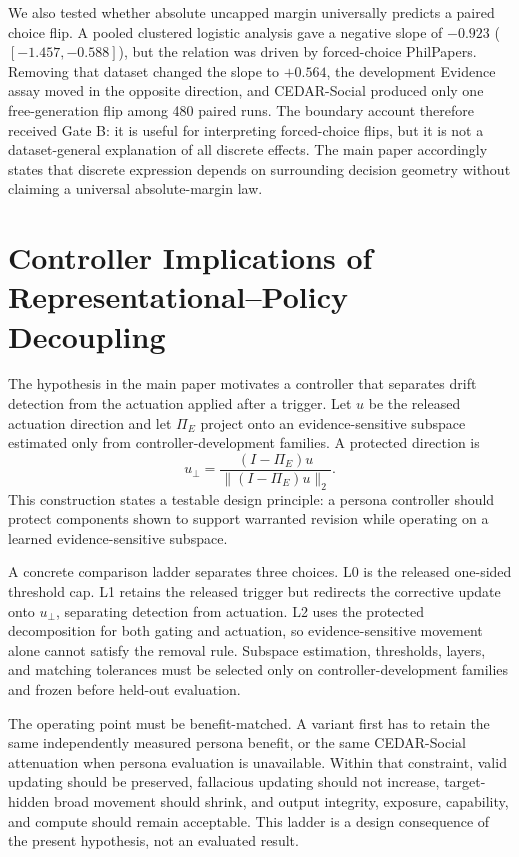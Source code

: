 \documentclass[letterpaper]{article}
\begin{document}
We also tested whether absolute uncapped margin universally predicts a paired choice flip.  A pooled clustered logistic analysis gave a negative slope of $-0.923$ ($[-1.457,-0.588]$), but the relation was driven by forced-choice PhilPapers.  Removing that dataset changed the slope to $+0.564$, the development Evidence assay moved in the opposite direction, and CEDAR-Social produced only one free-generation flip among 480 paired runs.  The boundary account therefore received Gate B: it is useful for interpreting forced-choice flips, but it is not a dataset-general explanation of all discrete effects.  The main paper accordingly states that discrete expression depends on surrounding decision geometry without claiming a universal absolute-margin law.

\section{Controller Implications of Representational--Policy Decoupling}
\label{supp:controller}

The hypothesis in the main paper motivates a controller that separates drift detection from the actuation applied after a trigger.  Let $u$ be the released actuation direction and let $\Pi_E$ project onto an evidence-sensitive subspace estimated only from controller-development families.  A protected direction is
\begin{equation}
u_{\perp}=\frac{(I-\Pi_E)u}{\lVert(I-\Pi_E)u\rVert_2}.
\end{equation}
This construction states a testable design principle: a persona controller should protect components shown to support warranted revision while operating on a learned evidence-sensitive subspace.

A concrete comparison ladder separates three choices.  L0 is the released one-sided threshold cap.  L1 retains the released trigger but redirects the corrective update onto $u_{\perp}$, separating detection from actuation.  L2 uses the protected decomposition for both gating and actuation, so evidence-sensitive movement alone cannot satisfy the removal rule.  Subspace estimation, thresholds, layers, and matching tolerances must be selected only on controller-development families and frozen before held-out evaluation.

The operating point must be benefit-matched.  A variant first has to retain the same independently measured persona benefit, or the same CEDAR-Social attenuation when persona evaluation is unavailable.  Within that constraint, valid updating should be preserved, fallacious updating should not increase, target-hidden broad movement should shrink, and output integrity, exposure, capability, and compute should remain acceptable.  This ladder is a design consequence of the present hypothesis, not an evaluated result.
\end{document}
